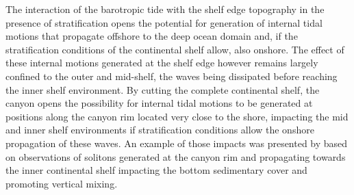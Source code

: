 The interaction of the barotropic tide with the shelf edge topography
in the presence of stratification opens the potential for generation
of internal tidal motions that propagate offshore to the deep ocean
domain and, if the stratification conditions of the continental shelf
allow, also onshore. The effect of these internal motions generated at
the shelf edge however remains largely confined to the outer and
mid-shelf, the waves being dissipated before reaching the inner shelf
environment. By cutting the complete continental shelf, the \naz
canyon opens the possibility for internal tidal motions to be
generated at positions along the canyon rim located very close to the
shore, impacting the mid and inner shelf environments if
stratification conditions allow the onshore propagation of these
waves. An example of those impacts was presented by \cite{quaresma07}
based on observations of solitons generated at the canyon rim and
propagating towards the inner continental shelf impacting the bottom
sedimentary cover and promoting vertical mixing.
